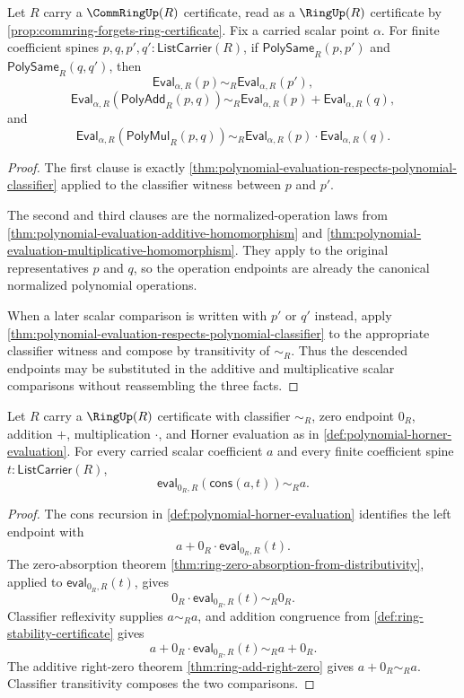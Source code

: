 \begin{theorem}
\label{thm:polynomial-evaluation-semiring-morphism}
Let $R$ carry a $\CommRingUp(R)$ certificate, read as a $\RingUp(R)$ certificate by \autoref{prop:commring-forgets-ring-certificate}. Fix a carried scalar point $\alpha$. For finite coefficient spines $p,q,p',q':\mathsf{ListCarrier}(R)$, if $\mathsf{PolySame}_R(p,p')$ and $\mathsf{PolySame}_R(q,q')$, then
$$
\mathsf{Eval}_{\alpha,R}(p)\sim_R\mathsf{Eval}_{\alpha,R}(p'),
$$
$$
\mathsf{Eval}_{\alpha,R}(\mathsf{PolyAdd}_R(p,q))\sim_R
\mathsf{Eval}_{\alpha,R}(p)+\mathsf{Eval}_{\alpha,R}(q),
$$
and
$$
\mathsf{Eval}_{\alpha,R}(\mathsf{PolyMul}_R(p,q))\sim_R
\mathsf{Eval}_{\alpha,R}(p)\cdot\mathsf{Eval}_{\alpha,R}(q).
$$
\end{theorem}
\begin{proof}
The first clause is exactly \autoref{thm:polynomial-evaluation-respects-polynomial-classifier} applied to the classifier witness between $p$ and $p'$.

The second and third clauses are the normalized-operation laws from \autoref{thm:polynomial-evaluation-additive-homomorphism} and \autoref{thm:polynomial-evaluation-multiplicative-homomorphism}. They apply to the original representatives $p$ and $q$, so the operation endpoints are already the canonical normalized polynomial operations.

When a later scalar comparison is written with $p'$ or $q'$ instead, apply \autoref{thm:polynomial-evaluation-respects-polynomial-classifier} to the appropriate classifier witness and compose by transitivity of $\sim_R$. Thus the descended endpoints may be substituted in the additive and multiplicative scalar comparisons without reassembling the three facts.
\end{proof}

\begin{lemma}
\label{lem:horner-evaluation-zero-cons-constant}
Let $R$ carry a $\RingUp(R)$ certificate with classifier $\sim_R$, zero endpoint $0_R$, addition $+$, multiplication $\cdot$, and Horner evaluation as in \autoref{def:polynomial-horner-evaluation}. For every carried scalar coefficient $a$ and every finite coefficient spine $t:\mathsf{ListCarrier}(R)$,
$$
\mathsf{eval}_{0_R,R}(\mathsf{cons}(a,t))\sim_R a.
$$
\end{lemma}
\begin{proof}
The cons recursion in \autoref{def:polynomial-horner-evaluation} identifies the left endpoint with
$$
a+0_R\cdot\mathsf{eval}_{0_R,R}(t).
$$
The zero-absorption theorem \autoref{thm:ring-zero-absorption-from-distributivity}, applied to $\mathsf{eval}_{0_R,R}(t)$, gives
$$
0_R\cdot\mathsf{eval}_{0_R,R}(t)\sim_R0_R.
$$
Classifier reflexivity supplies $a\sim_Ra$, and addition congruence from \autoref{def:ring-stability-certificate} gives
$$
a+0_R\cdot\mathsf{eval}_{0_R,R}(t)\sim_Ra+0_R.
$$
The additive right-zero theorem \autoref{thm:ring-add-right-zero} gives $a+0_R\sim_Ra$. Classifier transitivity composes the two comparisons.
\end{proof}

